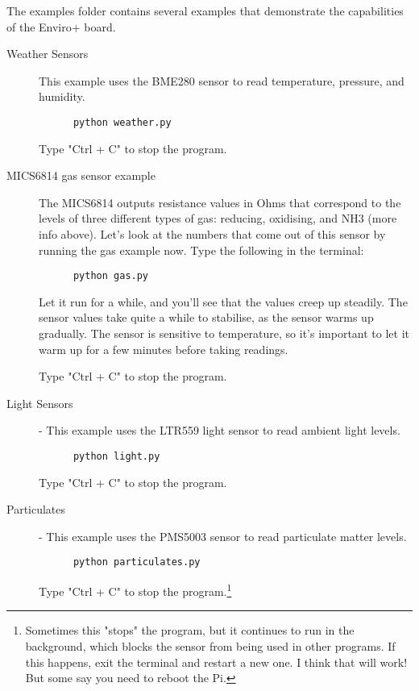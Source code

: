 \documentclass{article}
\begin{document}
The examples folder contains several examples that demonstrate the capabilities of the Enviro+ board.

\begin{description}
  \item[Weather Sensors] This example uses the BME280 sensor to read temperature, pressure, and humidity.
  
  \begin{verbatim}
      python weather.py
  \end{verbatim} 
  
  Type "Ctrl + C" to stop the program.
  
  \item[MICS6814 gas sensor example] The MICS6814 outputs resistance values in Ohms that correspond to the levels of three different types of gas: reducing, oxidising, and NH3 (more info above). Let's look at the numbers that come out of this sensor by running the gas example now. Type the following in the terminal:
  
  \begin{verbatim}
      python gas.py
  \end{verbatim}
  
Let it run for a while, and you'll see that the values creep up steadily. The sensor values take quite a while to stabilise, as the sensor warms up gradually. The sensor is sensitive to temperature, so it's important to let it warm up for a few minutes before taking readings.

Type "Ctrl + C" to stop the program.

\item[Light Sensors] - This example uses the LTR559 light sensor to read ambient light levels.

\begin{verbatim}
      python light.py
\end{verbatim}

Type "Ctrl + C" to stop the program.

\item[Particulates] - This example uses the PMS5003 sensor to read particulate matter levels.

\begin{verbatim}
      python particulates.py
\end{verbatim}

Type "Ctrl + C" to stop the program.\footnote{Sometimes this "stops" the program, but it continues to run in the background, which blocks the sensor from being used in other programs. If this happens, exit the terminal and restart a new one. I think that will work! But some say you need to reboot the Pi.}
  
\end{description}
\end{document}
